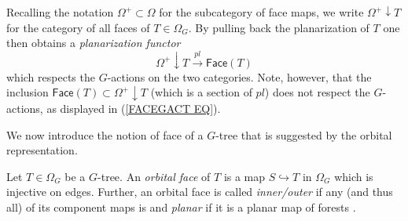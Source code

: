 \documentclass[a4paper,10pt
 ,draft
]{article}%
\begin{document}
\begin{remark}\label{PLFUNCTOR REM}
	Recalling the notation $\Omega^+ \subset \Omega$
	for the subcategory of face maps,
	we write $\Omega^+ \downarrow T$ for the category of all faces of $T \in \Omega_G$.
	By pulling back the planarization of $T$ one then obtains a \textit{planarization functor}
	\[
		\Omega^+ \downarrow T \xrightarrow{pl} \mathsf{Face}(T)
	\]
which respects the $G$-actions on the two categories.
	Note, however, that the inclusion 
	$\mathsf{Face}(T) \subset \Omega^+ \downarrow T$ (which is a section of $pl$) does not respect the $G$-actions, as displayed in (\ref{FACEGACT EQ}).
\end{remark}

We now introduce the notion of face of a $G$-tree that is suggested by the orbital representation.

\begin{definition}\label{ORBFACE DEF}
	Let $T \in \Omega_G$ be a $G$-tree.
	An \textit{orbital face} of $T$ is a map 
	$S \hookrightarrow T$ in $\Omega_G$ which is injective on edges. Further, an orbital face is called
	\textit{inner/outer} if any (and thus all) of its  component maps is and \textit{planar} if it is a planar map of forests \cite[Def. 3.21]{BP17}.
\end{definition}
\end{document}
